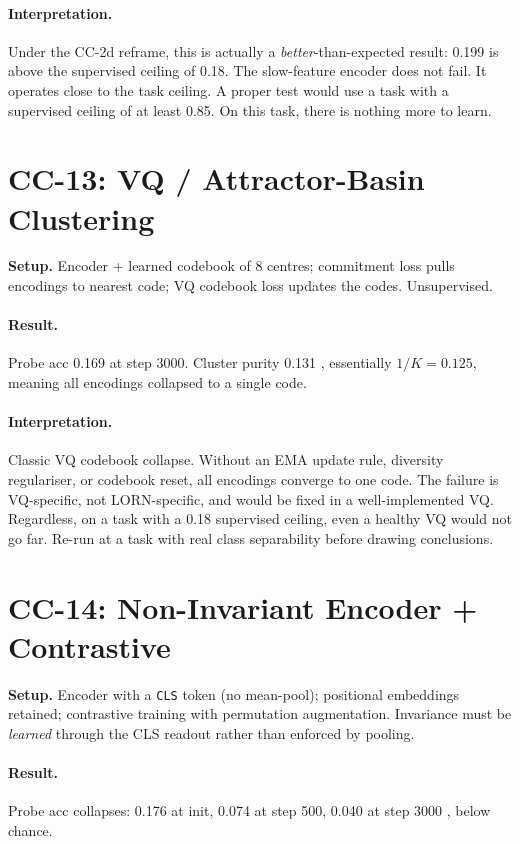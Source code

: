 \documentclass[10pt, twocolumn, a4paper]{article}
\begin{document}
\paragraph{Interpretation.} Under the CC-2d reframe, this is actually a \emph{better}-than-expected result: 0.199 is above the supervised ceiling of 0.18. The slow-feature encoder does not fail. It operates close to the task ceiling. A proper test would use a task with a supervised ceiling of at least 0.85. On this task, there is nothing more to learn.

\section{CC-13: VQ / Attractor-Basin Clustering}

\textbf{Setup.} Encoder + learned codebook of 8 centres; commitment loss pulls encodings to nearest code; VQ codebook loss updates the codes. Unsupervised.

\paragraph{Result.} Probe acc 0.169 at step 3000. Cluster purity 0.131 ,  essentially $1/K = 0.125$, meaning all encodings collapsed to a single code.

\paragraph{Interpretation.} Classic VQ codebook collapse. Without an EMA update rule, diversity regulariser, or codebook reset, all encodings converge to one code. The failure is VQ-specific, not LORN-specific, and would be fixed in a well-implemented VQ. Regardless, on a task with a 0.18 supervised ceiling, even a healthy VQ would not go far. Re-run at a task with real class separability before drawing conclusions.

\section{CC-14: Non-Invariant Encoder + Contrastive}

\textbf{Setup.} Encoder with a \texttt{CLS} token (no mean-pool); positional embeddings retained; contrastive training with permutation augmentation. Invariance must be \emph{learned} through the CLS readout rather than enforced by pooling.

\paragraph{Result.} Probe acc collapses: 0.176 at init, 0.074 at step 500, 0.040 at step 3000 ,  below chance.
\end{document}
